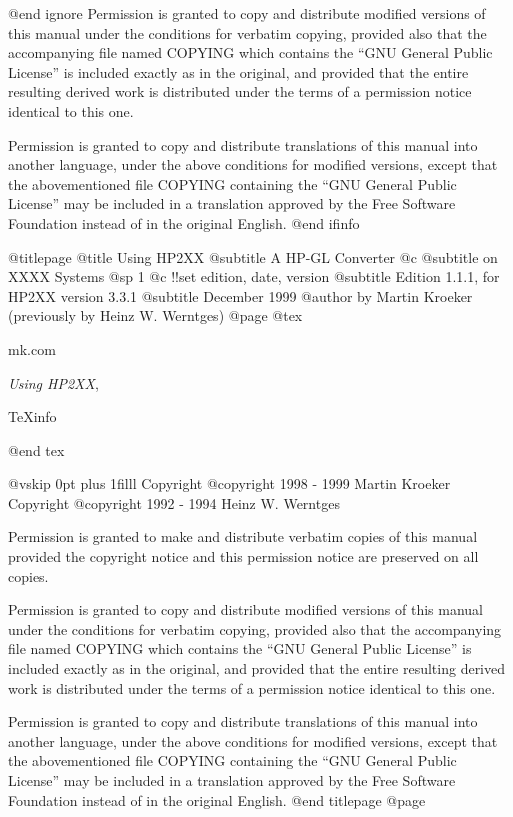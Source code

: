 @end ignore
Permission is granted to copy and distribute modified versions of this
manual under the conditions for verbatim copying, provided also that the
accompanying file named COPYING which contains the ``GNU General Public
License'' is included exactly as in the original, and provided that the
entire resulting derived work is distributed under the terms of a permission
notice identical to this one.

Permission is granted to copy and distribute translations of this manual
into another language, under the above conditions for modified versions,
except that the abovementioned file COPYING containing the
``GNU General Public License'' may be included in a translation approved
by the Free Software Foundation instead of in the original English.
@end ifinfo

@titlepage
@title Using HP2XX
@subtitle A HP-GL Converter
@c @subtitle on XXXX Systems
@sp 1
@c !!set edition, date, version
@subtitle Edition 1.1.1, for HP2XX version 3.3.1
@subtitle December 1999
@author by Martin Kroeker (previously by Heinz W. Werntges)
@page
@tex
{\parskip=0pt
\hfill mk\@daveg.com\par
\hfill {\it Using HP2XX}, \manvers\par
\hfill \TeX{}info \texinfoversion\par
}
@end tex

@vskip 0pt plus 1filll
Copyright @copyright{} 1998 - 1999 Martin Kroeker
Copyright @copyright{} 1992 - 1994 Heinz W. Werntges

Permission is granted to make and distribute verbatim copies of
this manual provided the copyright notice and this permission notice
are preserved on all copies.

Permission is granted to copy and distribute modified versions of this
manual under the conditions for verbatim copying, provided also that the
accompanying file named COPYING which contains the ``GNU General Public
License'' is included exactly as in the original, and provided that the
entire resulting derived work is distributed under the terms of a permission
notice identical to this one.

Permission is granted to copy and distribute translations of this manual
into another language, under the above conditions for modified versions,
except that the abovementioned file COPYING containing the
``GNU General Public License'' may be included in a translation approved
by the Free Software Foundation instead of in the original English.
@end titlepage
@page

